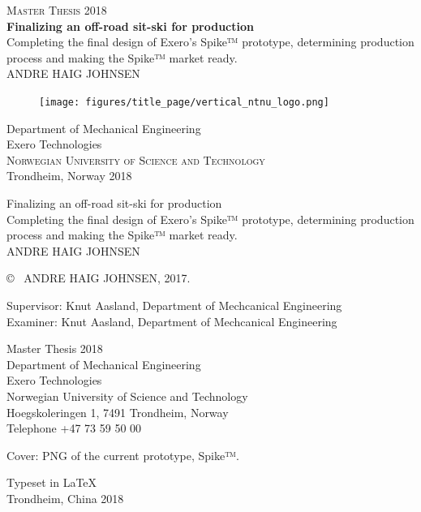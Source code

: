 \newpage
\thispagestyle{empty}
\begin{center}
	\textsc{\large Master Thesis 2018}\\[4cm]		%
	\textbf{\Large Finalizing an off-road sit-ski for production} \\[1cm]
	{\large Completing the final design of Exero’s Spike™ prototype, determining production process and making the Spike™ market ready.}\\[1cm]
	{\large ANDRE HAIG JOHNSEN}
	
	\vfill	
	\begin{figure}[H]
	\centering
	\texttt{[image: figures/title\_page/vertical\_ntnu\_logo.png]} \\	
	\end{figure}	\vspace{5mm}	
	
	Department of Mechanical Engineering \\
	Exero Technologies\\
	\textsc{Norwegian University of Science and Technology} \\
	Trondheim, Norway 2018 \\
\end{center}


\newpage
\thispagestyle{plain}
\vspace*{4.5cm}
Finalizing an off-road sit-ski for production\\
Completing the final design of Exero’s Spike™ prototype, determining production process and making the Spike™ market ready.\\
ANDRE HAIG JOHNSEN \setlength{\parskip}{1cm}

\copyright ~ ANDRE HAIG JOHNSEN, 2017. 
\setlength{\parskip}{1cm}

Supervisor: Knut Aasland, Department of Mechcanical Engineering\\
Examiner: Knut Aasland, Department of Mechcanical Engineering \setlength{\parskip}{1cm}

Master Thesis 2018\\	%
Department of Mechanical Engineering\\
Exero Technologies\\
Norwegian University of Science and Technology\\
Hoegskoleringen 1, 7491 Trondheim, Norway\\
Telephone +47 73 59 50 00 \setlength{\parskip}{0.5cm}

\vfill
Cover: PNG of the current prototype, Spike™. \setlength{\parskip}{0.5cm}

Typeset in \LaTeX \\
Trondheim, China 2018